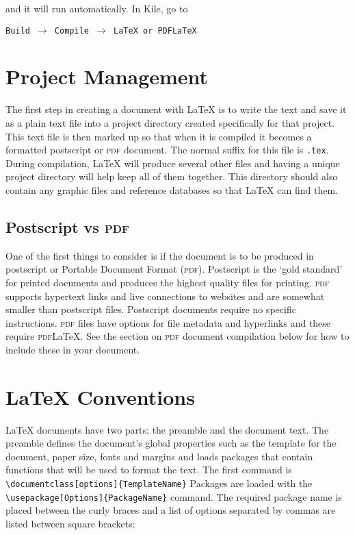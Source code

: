 \documentclass[12pt, a4paper]{article}
\begin{document}
\begin{flushleft}
and it will run automatically. In Kile, go to 
\end{flushleft}
 
 
\begin{flushleft}
\texttt{Build $\rightarrow$ Compile $\rightarrow$ LaTeX or PDFLaTeX }
\end{flushleft}



\clearpage


\section{Project Management}

The first step in creating a document with LaTeX is to write the text and save it as a plain text file into a project directory created specifically for that project. This text file is then marked up so that when it is compiled it becomes a formatted postscript or \textsc{pdf} document. The normal suffix for this file is \texttt{.tex}. During compilation, LaTeX will produce several other files and having a unique project directory will help keep all of them together. This directory should also contain any graphic files and reference databases so that LaTeX can find them.


\subsection{Postscript vs \textsc{pdf}}

One of the first things to consider is if the document is to be produced in postscript or Portable Document Format (\textsc{pdf}). Postscript is the `gold standard’ for printed documents and produces the highest quality files for printing. \textsc{pdf} supports hypertext links and live connections to websites and are somewhat smaller than postscript files. Postscript documents require no specific instructions. \textsc{pdf} files have options for file metadata and hyperlinks and these require \textsc{pdf}LaTeX. See the section on \textsc{pdf} document compilation below for how to include these in your document.


\clearpage



\section{LaTeX Conventions}

LaTeX documents have two parts: the preamble and the document text. The preamble defines the document's global properties such as the template for the document, paper size, fonts and margins and loads packages that contain functions that will be used to format the text. The first command is \texttt{\textbackslash documentclass[options]\{TemplateName\}}  Packages are loaded with the \texttt{\textbackslash usepackage[Options]\{PackageName\}} command. The required package name is placed between the curly braces and a list of options separated by commas are listed between square brackets: 
\end{document}
